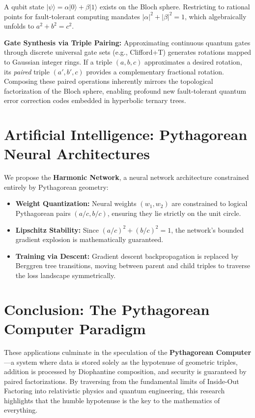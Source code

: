 \documentclass[12pt,a4paper]{article}
\begin{document}
A qubit state $|\psi\rangle = \alpha|0\rangle + \beta|1\rangle$ exists on the Bloch sphere. Restricting to rational points for fault-tolerant computing mandates $|\alpha|^2 + |\beta|^2 = 1$, which algebraically unfolds to $a^2 + b^2 = c^2$.

\textbf{Gate Synthesis via Triple Pairing:}
Approximating continuous quantum gates through discrete universal gate sets (e.g., Clifford+T) generates rotations mapped to Gaussian integer rings. If a triple $(a, b, c)$ approximates a desired rotation, its \textit{paired} triple $(a', b', c)$ provides a complementary fractional rotation. Composing these paired operations inherently mirrors the topological factorization of the Bloch sphere, enabling profound new fault-tolerant quantum error correction codes embedded in hyperbolic ternary trees.

\section{Artificial Intelligence: Pythagorean Neural Architectures}

We propose the \textbf{Harmonic Network}, a neural network architecture constrained entirely by Pythagorean geometry:
\begin{itemize}
    \item \textbf{Weight Quantization:} Neural weights $(w_1, w_2)$ are constrained to logical Pythagorean pairs $(a/c, b/c)$, ensuring they lie strictly on the unit circle.
    \item \textbf{Lipschitz Stability:} Since $(a/c)^2 + (b/c)^2 = 1$, the network's bounded gradient explosion is mathematically guaranteed.
    \item \textbf{Training via Descent:} Gradient descent backpropagation is replaced by Berggren tree transitions, moving between parent and child triples to traverse the loss landscape symmetrically.
\end{itemize}

\section{Conclusion: The Pythagorean Computer Paradigm}

These applications culminate in the speculation of the \textbf{Pythagorean Computer}---a system where data is stored solely as the hypotenuse of geometric triples, addition is processed by Diophantine composition, and security is guaranteed by paired factorizations. By traversing from the fundamental limits of Inside-Out Factoring into relativistic physics and quantum engineering, this research highlights that the humble hypotenuse is the key to the mathematics of everything.
\end{document}
